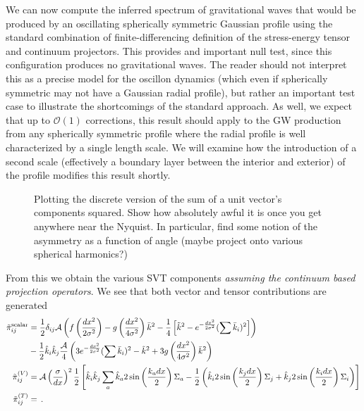 \documentclass{revtex4}
\begin{document}
We can now compute the inferred spectrum of gravitational waves that would be produced by an oscillating spherically symmetric Gaussian profile using the standard combination of finite-differencing definition of the stress-energy tensor and continuum projectors.
This provides and important null test, since this configuration produces no gravitational waves.
The reader should not interpret this as a precise model for the oscillon dynamics (which even if spherically symmetric may not have a Gaussian radial profile), but rather an important test case to illustrate the shortcomings of the standard approach.
As well, we expect that up to $\mathcal{O}(1)$ corrections, this result should apply to the GW production from any spherically symmetric profile where the radial profile is well characterized by a single length scale.
We will examine how the introduction of a second scale (effectively a boundary layer between the interior and exterior) of the profile modifies this result shortly.

\begin{figure}
  \caption{Plotting the discrete version of the sum of a unit vector's components squared.  Show how absolutely awful it is once you get anywhere near the Nyquist.  In particular, find some notion of the asymmetry as a function of angle (maybe project onto various spherical harmonics?)}
\end{figure}


From this we obtain the various SVT components \emph{assuming the continuum based projection operators}.  We see that both vector and tensor contributions are generated
\begin{subequations}
  \begin{align}
    \tilde{\pi}_{ij}^{\rm scalar} &= \frac{1}{2}\delta_{ij}\mathcal{A}\left(f\left(\frac{dx^2}{2\sigma^2}\right) - g\left(\frac{dx^2}{4\sigma^2}\right)\bar{k}^2 - \frac{1}{4}\left[ \tilde{k}^2 - e^{-\frac{dx^2}{2\sigma^2}}(\sum \bar{k}_i)^2\right]\right) \\
       &- \frac{1}{2}\hat{k}_i\hat{k}_j\frac{\mathcal{A}}{4}\left(3e^{-\frac{dx^2}{2\sigma^2}}(\sum\bar{k}_i)^2 - \tilde{k}^2 + 3g\left(\frac{dx^2}{4\sigma^2}\right)\bar{k}^2 \right) \\
    \tilde{\pi}_{ij}^{(V)} &= \mathcal{A}\left(\frac{\sigma}{dx}\right)^2\frac{1}{2}\left[\hat{k}_i\hat{k}_j\sum_a\hat{k}_a2\sin\left(\frac{k_adx}{2}\right)\Sigma_a - \frac{1}{2}\left(\hat{k}_i2\sin\left(\frac{k_jdx}{2}\right)\Sigma_j + \hat{k}_j2\sin\left(\frac{k_idx}{2}\right)\Sigma_i\right) \right]\\
    \tilde{\pi}_{ij}^{(T)} &= \, .
  \end{align}
\end{subequations}
\end{document}
